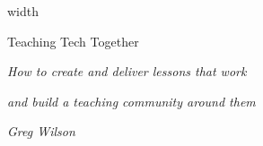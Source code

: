 \cleardoublepage
\thispagestyle{empty}

\vspace*{-35pt}

\noindent\hbox{\vrule height4pt width\textwidth}\vspace*{22pt}

{\FMCT
  Teaching Tech Together
}

\vspace{0.5in}

\noindent
\emph{\FMCTsub How to create and deliver lessons that work}

\vspace{0.5em}

\noindent
\emph{\FMCTsub and build a teaching community around them}

\vspace{0.5in}       

\noindent
\emph{\FMCTauth Greg Wilson}
